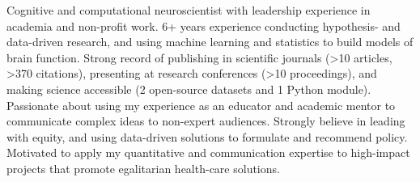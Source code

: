 

\begin{cvparagraph}

Cognitive and computational neuroscientist with leadership experience in academia and non-profit work. 6+ years experience conducting hypothesis- and data-driven research, and using machine learning and statistics to build models of brain function. Strong record of publishing in scientific journals (>10 articles, >370 citations), presenting at research conferences (>10 proceedings), and making science accessible (2 open-source datasets and 1 Python module). Passionate about using my experience as an educator and academic mentor to communicate complex ideas to non-expert audiences. Strongly believe in leading with equity, and using data-driven solutions to formulate and recommend policy. Motivated to apply my quantitative and communication expertise to high-impact projects that promote egalitarian health-care solutions. 

\end{cvparagraph}
